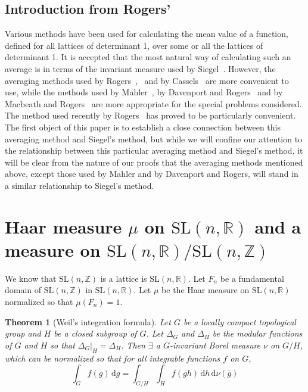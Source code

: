\documentclass[11pt]{article}
\newtheorem{theorem}{Theorem}[section]
\theoremstyle{definition}
\theoremstyle{proof}
\begin{document}
\subsection{Introduction from Rogers'~\cite{rogers55b}}
Various methods have been used for calculating the mean value of a function, defined for all lattices of determinant 1, over some or all the lattices of determinant 1.
It is accepted that the most natural way of calculating such an average is in terms of the invariant measure used by Siegel~\cite{siegel45}.
However, the averaging methods used by Rogers~\cite{rogers47},~\cite{rogers55a} and by Cassels~\cite{cassels53} are more convenient to use, while the methods used by Mahler~\cite{mahler46}, by Davenport and Rogers~\cite{davenportrogers47} and by Macbeath and Rogers~\cite{macbeathrogers55} are more appropriate for the special problems considered.
The method used recently by Rogers~\cite{rogers55a} has proved to be particularly convenient.
The first object of this paper is to establish a close connection between this averaging method and Siegel's method, but while we will confine our attention to the relationship between this particular averaging method and Siegel's method, it will be clear from the nature of our proofs that the averaging methods mentioned above, except those used by Mahler and by Davenport and Rogers, will stand in a similar relationship to Siegel's method.

\section{Haar measure $\mu$ on $\mathrm{SL}(n,  \mathbb{R})$ and a measure on $\mathrm{SL}(n,\mathbb{R})/\mathrm{SL}(n,\mathbb{Z})$}
We know that $\mathrm{SL}(n,\mathbb{Z})$ is a lattice is $\mathrm{SL}(n,\mathbb{R})$.
Let $F_n$ be a fundamental domain of $\mathrm{SL}(n,\mathbb{Z})$ in $\mathrm{SL}(n,\mathbb{R})$.
Let $\mu$ be the Haar measure on $\mathrm{SL}(n,\mathbb{R})$ normalized so that $\mu (F_n)=1$.

\begin{theorem}[Weil's integration formula]\label{thm}
    Let $G$ be a locally compact topological group and $H$ be a closed subgroup of $G$.
    Let $\Delta_G$ and $\Delta _H$ be the modular functions of $G$ and $H$ so that $\Delta _G\big|_H = \Delta _H$.
    Then $\exists$ a $G$-invariant Borel measure $\nu$ on $G/H$, which can be normalized so that for all integrable functions $f$ on $G$,
    \[
        \int_{G}f(g) \, \mathrm{d} g = \int_{G/H}\int_{H}f(gh) \, \mathrm{d} h \, \mathrm{d} \nu (\bar{g})
    \]
\end{theorem}
\end{document}
